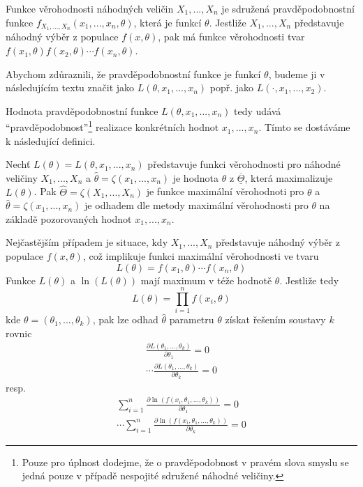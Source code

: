 \begin{definition}
Funkce věrohodnosti náhodných veličin $X_1, ..., X_n$ je sdružená pravděpodobnostní funkce $f_{X_1, ..., X_n}(x_1, ..., x_n, \theta)$, která je funkcí $\theta$. Jestliže $X_1, ..., X_n$ představuje náhodný výběr z populace $f(x, \theta)$, pak má funkce věrohodnosti tvar $f(x_1, \theta) f(x_2, \theta) \cdots f(x_n, \theta)$.

Abychom zdůraznili, že pravděpodobnostní funkce je funkcí $\theta$, budeme ji v následujícím textu značit jako $L(\theta, x_1, ..., x_n)$ popř. jako $L(\cdot, x_1, ..., x_2)$.
\end{definition}

Hodnota pravděpodobnostní funkce $L(\theta, x_1, ..., x_n)$ tedy udává ``pravděpodobnost''\footnote{Pouze pro úplnost dodejme, že o pravděpodobnost v pravém slova smyslu se jedná pouze v případě nespojité sdružené náhodné veličiny.} realizace konkrétních hodnot $x_1, ..., x_n$. Tímto se dostáváme k následující definici.

\begin{definition}
Nechť $L(\theta) = L(\theta, x_1, ..., x_n)$ představuje funkci věrohodnosti pro náhodné veličiny $X_1, ..., X_n$ a $\hat{\theta} = \zeta(x_1, ..., x_n)$ je hodnota $\theta$ z $\overline{\underline{\Theta}}$, která maximalizuje $L(\theta)$. Pak $\hat{\Theta} = \zeta(X_1, ..., X_n)$ je funkce maximální věrohodnoti pro $\theta$ a $\hat{\theta} = \zeta(x_1, ..., x_n)$ je odhadem dle metody maximální věrohodnosti pro $\theta$ na základě pozorovaných hodnot $x_1, ..., x_n$.
\end{definition}

Nejčastějším případem je situace, kdy $X_1, ..., X_n$ představuje náhodný výběr z populace $f(x, \theta)$, což implikuje funkci maximální věrohodnosti ve tvaru
\begin{equation*}
L(\theta) = f(x_1, \theta) \cdots f(x_n, \theta)
\end{equation*}
Funkce $L(\theta)$ a $\ln\left(L(\theta)\right)$ mají maximum v téže hodnotě $\theta$. Jestliže tedy
\begin{equation*}
L(\theta) = \prod_{i = 1}^n f(x_i, \theta)
\end{equation*}
kde $\theta = (\theta_1, ..., \theta_k)$, pak lze odhad $\hat{\theta}$ parametru $\theta$ získat řešením soustavy $k$ rovnic
\begin{gather*}
\frac{\partial L(\theta_1, ..., \theta_k)}{\partial \theta_1} = 0\\
\cdots
\frac{\partial L(\theta_1, ..., \theta_k)}{\partial \theta_k} = 0
\end{gather*}
resp.
\begin{gather*}
\sum_{i = 1}^n \frac{\partial \ln \left(f(x_i, \theta_1, ..., \theta_k)\right)}{\partial \theta_1} = 0\\
\cdots
\sum_{i = 1}^n \frac{\partial \ln \left(f(x_i, \theta_1, ..., \theta_k)\right)}{\partial \theta_k} = 0
\end{gather*}

